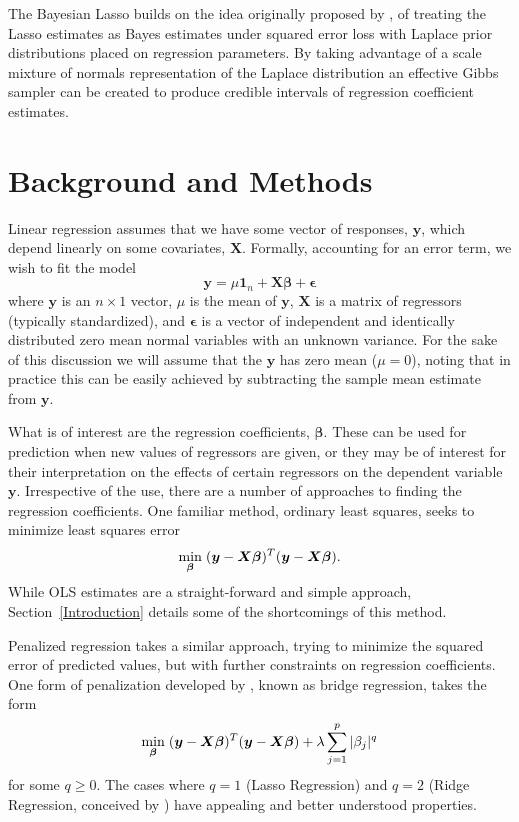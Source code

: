 \documentclass{uwstat572}
\begin{document}
The Bayesian Lasso builds on the idea originally proposed by \cite{tibshirani1996regression}, of treating the Lasso estimates as Bayes estimates under squared error loss with Laplace prior distributions placed on regression parameters. By taking advantage of a scale mixture of normals representation of the Laplace distribution an effective Gibbs sampler can be created to produce credible intervals of regression coefficient estimates.

\section{Background and Methods}
Linear regression assumes that we have some vector of responses, $\boldsymbol{y}$, which depend linearly on some covariates, $\boldsymbol{X}$. Formally, accounting for an error term, we wish to fit the model \[
\boldsymbol{y} = \mu \boldsymbol{1}_n + \boldsymbol{X}\boldsymbol{\beta}+\boldsymbol{\epsilon}
\] where $\boldsymbol{y}$ is an $n \times 1$ vector, $\mu$ is the mean of $\boldsymbol{y}$, $\boldsymbol{X}$ is a matrix of regressors (typically standardized), and $\boldsymbol{\epsilon}$ is a vector of independent and identically distributed zero mean normal variables with an unknown variance. For the sake of this discussion we will assume that the $\boldsymbol{y}$ has zero mean ($\mu=0$), noting that in practice this can be easily achieved by subtracting the sample mean estimate from $\mathbf{y}$.

What is of interest are the regression coefficients, $\boldsymbol{\beta}$. These can be used for prediction when new values of regressors are given, or they may be of interest for their interpretation on the effects of certain regressors on the dependent variable $\boldsymbol{y}$. Irrespective of the use, there are a number of approaches to finding the regression coefficients. One familiar method, ordinary least squares, seeks to minimize least squares error\[
\min_{\boldsymbol{\beta}} \hspace{.1cm} (\boldsymbol{y}-\boldsymbol{X}\boldsymbol{\beta})^T(\boldsymbol{y}-\boldsymbol{X}\boldsymbol{\beta}).
\] While OLS estimates are a straight-forward and simple approach, Section~\ref{Introduction} details some of the shortcomings of this method.

Penalized regression takes a similar approach, trying to minimize the squared error of predicted values, but with further constraints on regression coefficients. One form of penalization developed by \cite{fu1998penalized}, known as bridge regression, takes the form  \[
\min_{\boldsymbol{\beta}}  \hspace{.1cm} (\boldsymbol{y}-\boldsymbol{X}\boldsymbol{\beta})^T(\boldsymbol{y}-\boldsymbol{X}\boldsymbol{\beta})+\lambda\sum_{j=1}^p|\beta_j|^q
\] for some $q\geq0$. The cases where $q=1$ (Lasso Regression) and $q=2$ (Ridge Regression, conceived by \cite{hoerl1970ridge}) have appealing and better understood properties.
\end{document}
